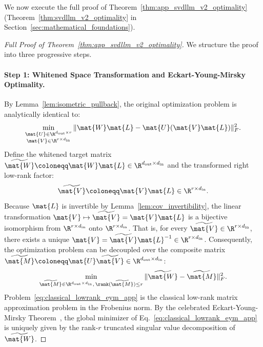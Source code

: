 We now execute the full proof of Theorem~\ref{thm:app_svdllm_v2_optimality} (Theorem~\ref{thm:svdllm_v2_optimality} in Section~\ref{sec:mathematical_foundations}).

\begin{proof}[Full Proof of Theorem~\ref{thm:app_svdllm_v2_optimality}]
We structure the proof into three progressive steps.

\paragraph{Step 1: Whitened Space Transformation and Eckart-Young-Mirsky Optimality.}
By Lemma~\ref{lem:isometric_pullback}, the original optimization problem is analytically identical to:
\begin{equation}
\min_{\substack{\mat{U} \in \R^{d_{\text{out}} \times r} \\ \mat{V} \in \R^{r \times d_{\text{in}}}}} \|\mat{W} \mat{L} - \mat{U} (\mat{V} \mat{L})\|_F^2.
\label{eq:thm1_step1_transformed}
\end{equation}
Define the whitened target matrix $\widetilde{\mat{W}} \coloneqq \mat{W} \mat{L} \in \R^{d_{\text{out}} \times d_{\text{in}}}$ and the transformed right low-rank factor:
\begin{equation}
\widetilde{\mat{V}} \coloneqq \mat{V} \mat{L} \in \R^{r \times d_{\text{in}}}.
\label{eq:v_tilde_def}
\end{equation}
Because $\mat{L}$ is invertible by Lemma~\ref{lem:cov_invertibility}, the linear transformation $\mat{V} \mapsto \widetilde{\mat{V}} = \mat{V} \mat{L}$ is a bijective isomorphism from $\R^{r \times d_{\text{in}}}$ onto $\R^{r \times d_{\text{in}}}$. That is, for every $\widetilde{\mat{V}} \in \R^{r \times d_{\text{in}}}$, there exists a unique $\mat{V} = \widetilde{\mat{V}} \mat{L}^{-1} \in \R^{r \times d_{\text{in}}}$.
Consequently, the optimization problem can be decoupled over the composite matrix $\widetilde{\mat{M}} \coloneqq \mat{U} \widetilde{\mat{V}} \in \R^{d_{\text{out}} \times d_{\text{in}}}$:
\begin{equation}
\min_{\widetilde{\mat{M}} \in \R^{d_{\text{out}} \times d_{\text{in}}}, \, \rank(\widetilde{\mat{M}}) \le r} \|\widetilde{\mat{W}} - \widetilde{\mat{M}}\|_F^2.
\label{eq:classical_lowrank_eym_app}
\end{equation}
Problem~\eqref{eq:classical_lowrank_eym_app} is the classical low-rank matrix approximation problem in the Frobenius norm. By the celebrated Eckart-Young-Mirsky Theorem~\cite{eckart1936approximation}, the global minimizer of Eq.~\eqref{eq:classical_lowrank_eym_app} is uniquely given by the rank-$r$ truncated singular value decomposition of $\widetilde{\mat{W}}$.

\end{proof}
